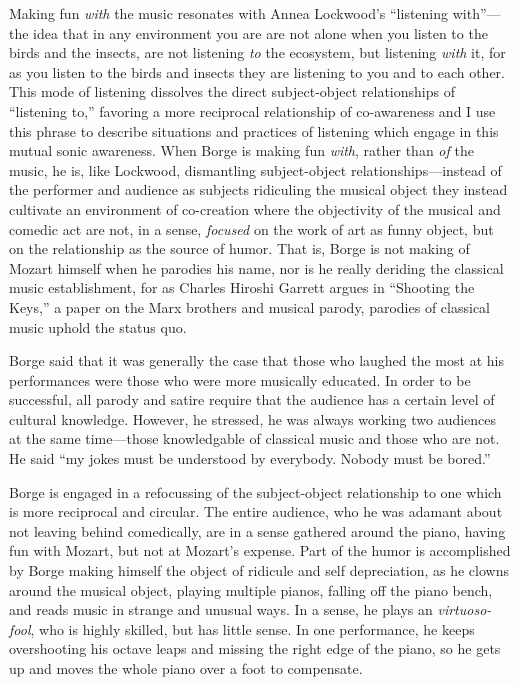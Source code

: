 \documentclass[12pt,letterpaper]{article}
\begin{document}
	Making fun \textit{with} the music resonates with Annea Lockwood's 
	``listening with''---the idea that in any 
	environment you are are not alone when you listen to the birds and the
	insects, are not listening \textit{to} the ecosystem, but listening 
	\textit{with} it, for as you listen to the birds and insects they
	are listening to you and to each other. This mode of listening dissolves
	 the direct 
	subject-object relationships of ``listening to,'' favoring a more 
	reciprocal relationship of co-awareness and I use this phrase to
	describe situations and practices of listening which engage in this
	mutual sonic awareness.  When Borge is making fun 
	\textit{with}, rather than \textit{of} the music, he is, like Lockwood, 
	dismantling subject-object relationships---instead of the performer and 
	audience as subjects ridiculing the musical object they instead 
	cultivate an environment of co-creation where the 
	objectivity of the musical and comedic act are not, in a sense, 
	\textit{focused} on the work of art as funny object, but on the 
	relationship as the source of humor. That is, Borge is not making of 
	Mozart himself when he parodies his name, nor is he really deriding the
 	classical music establishment, for as Charles Hiroshi Garrett argues in	
	``Shooting the Keys,'' a paper on the Marx brothers and musical parody, 
	parodies of classical music uphold the status 
	quo.\autocite[252]{Garrett}

	Borge said that it was generally the case that those who laughed
	the most at his performances were those who were more musically 
	educated. In order to be successful, all parody and satire require that
	the audience has a certain level of cultural 
	knowledge.\autocite[249]{Garrett} However, he stressed, he was always 
	working two audiences at the same time---those knowledgable of classical
	music and those who are not. He said ``my jokes must be understood by 
	everybody. Nobody must be bored.''\autocite[256]{Garrett} 

 	Borge is engaged in a refocussing of the subject-object 
	relationship to one which is more reciprocal and circular. The entire 
	audience, who he was adamant about not leaving behind comedically, are
	in a sense gathered around the piano, having fun with Mozart, but not at
	Mozart's expense. Part of the humor is accomplished by Borge making 
	himself
	the object of ridicule and self depreciation, as he clowns around the
	musical object, playing multiple pianos, falling off the piano bench,
	and reads music in strange and unusual ways. In a sense, he plays an
	\textit{virtuoso-fool}, who is highly skilled, but has little sense. 
	In one performance, he keeps overshooting his octave leaps and missing
	the right edge of the piano, so he gets up and moves the whole piano
	over a foot to compensate. 
\end{document}
